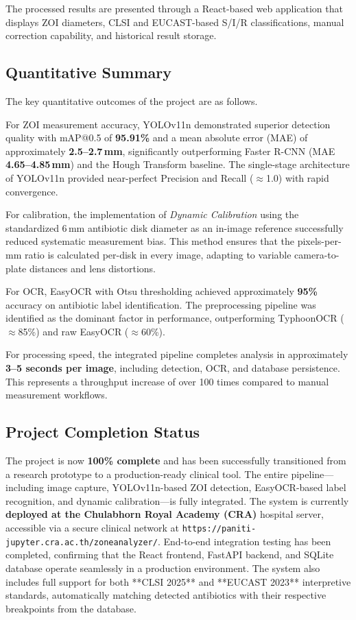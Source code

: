 The processed results are presented through a React-based web application that displays ZOI diameters, CLSI and EUCAST-based S/I/R classifications, manual correction capability, and historical result storage.

\subsection{Quantitative Summary}

The key quantitative outcomes of the project are as follows.

For ZOI measurement accuracy, YOLOv11n demonstrated superior detection quality with mAP@0.5 of \textbf{95.91\%} and a mean absolute error (MAE) of approximately \textbf{2.5--2.7\,mm}, significantly outperforming Faster R-CNN (MAE \textbf{4.65--4.85\,mm}) and the Hough Transform baseline.
The single-stage architecture of YOLOv11n provided near-perfect Precision and Recall ($\approx$1.0) with rapid convergence.

For calibration, the implementation of \emph{Dynamic Calibration} using the standardized 6\,mm antibiotic disk diameter as an in-image reference successfully reduced systematic measurement bias.
This method ensures that the pixels-per-mm ratio is calculated per-disk in every image, adapting to variable camera-to-plate distances and lens distortions.

For OCR, EasyOCR with Otsu thresholding achieved approximately \textbf{95\%} accuracy on antibiotic label identification.
The preprocessing pipeline was identified as the dominant factor in performance, outperforming TyphoonOCR ($\approx$85\%) and raw EasyOCR ($\approx$60\%).

For processing speed, the integrated pipeline completes analysis in approximately \textbf{3--5 seconds per image}, including detection, OCR, and database persistence.
This represents a throughput increase of over 100 times compared to manual measurement workflows.

\subsection{Project Completion Status}

The project is now \textbf{100\% complete} and has been successfully transitioned from a research prototype to a production-ready clinical tool.
The entire pipeline---including image capture, YOLOv11n-based ZOI detection, EasyOCR-based label recognition, and dynamic calibration---is fully integrated.
The system is currently \textbf{deployed at the Chulabhorn Royal Academy (CRA)} hospital server, accessible via a secure clinical network at \texttt{https://paniti-jupyter.cra.ac.th/zoneanalyzer/}.
End-to-end integration testing has been completed, confirming that the React frontend, FastAPI backend, and SQLite database operate seamlessly in a production environment.
The system also includes full support for both **CLSI 2025** and **EUCAST 2023** interpretive standards, automatically matching detected antibiotics with their respective breakpoints from the database.

